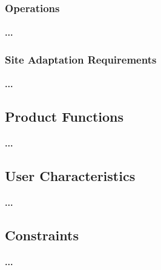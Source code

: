 \documentclass[runningheads,a4paper]{llncs}
\begin{document}
\subsubsection{Operations}
\paragraph{...}
\subsubsection{Site Adaptation Requirements}
\paragraph{...}

\subsection{Product Functions}
\paragraph{...}
\subsection{User Characteristics}
\paragraph{...}
\subsection{Constraints}
\paragraph{...}

\end{document}
